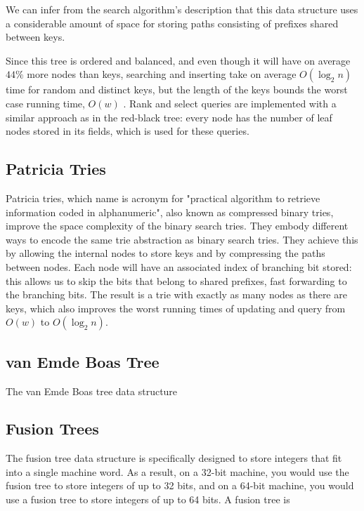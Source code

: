 We can infer from the search algorithm's description that this data structure uses a considerable amount of space for storing paths consisting of prefixes shared between keys.

Since this tree is ordered and balanced, and even though it will have on average $44\%$ more nodes than keys, searching and inserting take on average $O(\log_2 n)$ time for random and distinct keys, but the length of the keys bounds the worst case running time, $O(w)$ \cite{sedgewick2002algorithms}. Rank and select queries are implemented with a similar approach as in the red-black tree: every node has the number of leaf nodes stored in its fields, which is used for these queries.

\subsection{Patricia Tries}

Patricia tries, which name is acronym for "practical algorithm to retrieve information coded in alphanumeric", also known as compressed binary tries, improve the space complexity of the binary search tries.
They embody different ways to encode the same trie abstraction as binary search tries.
They achieve this by allowing the internal nodes to store keys and by compressing the paths between nodes.
Each node will have an associated index of branching bit stored: this allows us to skip the bits that belong to shared prefixes, fast forwarding to the branching bits.
The result is a trie with exactly as many nodes as there are keys, which also improves the worst running times of updating and query from $O(w)$ to $O(\log_2 n)$.

\subsection{van Emde Boas Tree}

The van Emde Boas tree data structure 

\subsection{Fusion Trees}

The fusion tree data structure is specifically designed to store integers that fit into a single machine word. As a result, on a 32-bit machine, you would use the fusion tree to store integers of up to 32 bits, and on a 64-bit machine, you would use a fusion tree to store integers of up to 64 bits.
A fusion tree is 

